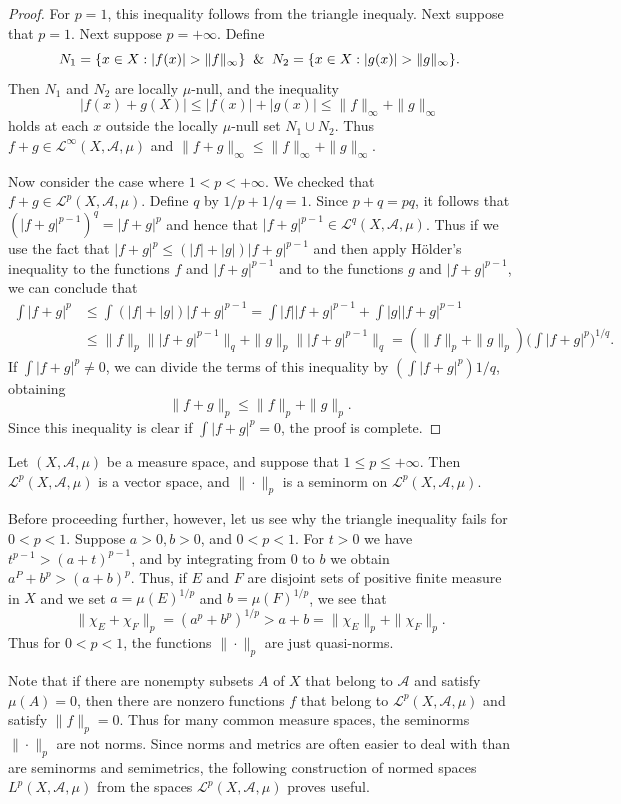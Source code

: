 \begin{proof}
For $p=1$, this inequality follows from the triangle inequaly. Next suppose that $p=1$. Next suppose $p=+\infty$. Define
\[N_1=\{x\in X:|f(x)|>\|f\|_{\infty}\}\And N_2=\{x\in X:|g(x)|>\|g\|_\infty\}.\]
Then $N_1$ and $N_2$ are locally $\mu$-null, and the inequality
\[|f(x)+g(X)|\leq|f(x)|+|g(x)|\leq\|f\|_\infty+\|g\|_\infty\]
holds at each $x$ outside the locally $\mu$-null set $N_1\cup N_2$. Thus $f+g\in\mathcal{L}^\infty(X,\mathcal{A},\mu)$ and $\|f+g\|_\infty\leq\|f\|_\infty+\|g\|_\infty$.\par
Now consider the case where $1<p<+\infty$. We checked that $f+g\in\mathcal{L}^p(X,\mathcal{A},\mu)$. Define $q$ by $1/p+1/q=1$. Since $p+q=pq$, it follows that $(|f+g|^{p-1})^q=|f+g|^p$ and hence that $|f+g|^{p-1}\in\mathcal{L}^q(X,\mathcal{A},\mu)$. Thus if we use the fact that $|f+g|^p\leq (|f|+|g|)|f+g|^{p-1}$ and then apply H\"older's inequality to the functions $f$ and $|f+g|^{p-1}$ and to the functions $g$ and $|f+g|^{p-1}$, we can conclude that
\begin{align*}
\int|f+g|^p&\leq\int(|f|+|g|)|f+g|^{p-1}=\int|f||f+g|^{p-1}+\int|g||f+g|^{p-1}\\
&\leq\|f\|_p\||f+g|^{p-1}\|_q+\|g\|_p\||f+g|^{p-1}\|_q=(\|f\|_p+\|g\|_p)\Big(\int|f+g|^p\Big)^{1/q}.
\end{align*}
If $\int|f+g|^p\neq 0$, we can divide the terms of this inequality by $(\int|f+g|^p)1/q$, obtaining
\[\|f+g\|_p\leq\|f\|_p+\|g\|_p.\]
Since this inequality is clear if $\int|f+g|^p=0$, the proof is complete.
\end{proof}
\begin{corollary}
Let $(X,\mathcal{A},\mu)$ be a measure space, and suppose that $1\leq p\leq+\infty$. Then $\mathcal{L}^p(X,\mathcal{A},\mu)$ is a vector space, and $\|\cdot\|_p$ is a seminorm on $\mathcal{L}^p(X,\mathcal{A},\mu)$.
\end{corollary}
Before proceeding further, however, let us see why the triangle inequality fails for $0<p<1$. Suppose $a>0,b>0$, and $0<p<1$. For $t>0$ we have $t^{p-1}>(a+t)^{p-1}$, and by integrating from $0$ to $b$ we obtain $a^P+b^p>(a+b)^p$. Thus, if $E$ and $F$ are disjoint sets of positive finite measure in $X$ and we set $a=\mu(E)^{1/p}$ and $b=\mu(F)^{1/p}$, we see that
\[\|\chi_E+\chi_F\|_p=(a^p+b^p)^{1/p}>a+b=\|\chi_{E}\|_p+\|\chi_F\|_p.\]
Thus for $0<p<1$, the functions $\|\cdot\|_p$ are just quasi-norms.\par
Note that if there are nonempty subsets $A$ of $X$ that belong to $\mathcal{A}$ and satisfy $\mu(A)=0$, then there are nonzero functions $f$ that belong to $\mathcal{L}^p(X,\mathcal{A},\mu)$ and satisfy $\|f\|_p=0$. Thus for many common measure spaces, the seminorms $\|\cdot\|_p$ are not norms. Since norms and metrics are often easier to deal with than are seminorms and semimetrics, the following construction of normed spaces $L^p(X,\mathcal{A},\mu)$ from the spaces $\mathcal{L}^p(X,\mathcal{A},\mu)$ proves useful.\par
